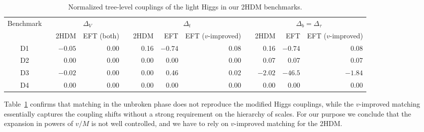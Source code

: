 \begin{table}[t] \renewcommand{\arraystretch}{1.2}
\setlength{\tabcolsep}{0.3em} \centering \footnotesize
  \begin{tabular}{c c rr c rrr c rrr} \toprule
\multirow{2}{*}{Benchmark} &\hspace*{0.5em}&
\multicolumn{2}{c}{$\Delta_V$} &\hspace*{0.5em}&
\multicolumn{3}{c}{$\Delta_t$} &\hspace*{1em}&
\multicolumn{3}{c}{$\Delta_b=\Delta_\tau$} \\ \cmidrule{3-4}
\cmidrule{6-8} \cmidrule{10-12} && 2HDM & EFT (both) && 2HDM & EFT &
EFT ($v$-improved) && 2HDM & EFT & EFT ($v$-improved) \\ \midrule D1
&&$-0.05$ & 0.00 && 0.16 & $-0.74$ & 0.08 && 0.16 & $-0.74$ & 0.08 \\
D2 && 0.00 & 0.00 && 0.00 & 0.00 & 0.00 && 0.07 & 0.07 & 0.07 \\ D3
&&$-0.02$ & 0.00 && 0.00 & 0.46 & 0.02 && $-2.02$ & $-46.5$ & $-1.84$
\\ D4 && 0.00 & 0.00 && 0.00 & 0.00 & 0.00 && 0.00 & 0.00 & 0.00 \\
\bottomrule
  \end{tabular}
  \caption{Normalized tree-level couplings of the light Higgs in our
2HDM benchmarks. }
  \label{tab:2HDM_couplings_tree} \setlength{\tabcolsep}{0.5em}
\end{table}
 
Table~\ref{tab:2HDM_couplings_tree} confirms that matching in the
unbroken phase does not reproduce the modified Higgs couplings, while
the $v$-improved matching essentially captures the coupling shifts
without a strong requirement on the hierarchy of scales. For our
purpose we conclude that the expansion in powers of $v/M$ is not well
controlled, and we have to rely on $v$-improved matching for the
2HDM.\medskip

